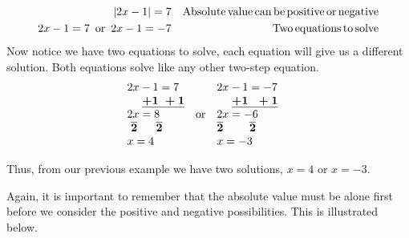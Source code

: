 \begin{example}\label{Lin38}
  \begin{eqnarray*}
    |2x - 1| = 7 &  & \operatorname{Absolute} \operatorname{value} \operatorname{can} \operatorname{be}
    \operatorname{positive} \operatorname{or} \operatorname{negative}\\
    2 x - 1 = 7 \operatorname{~or~} 2 x - 1 = - 7 &  & \operatorname{Two} \operatorname{equations}
    \operatorname{to} \operatorname{solve}
  \end{eqnarray*}
   Now notice we have two equations to solve, each equation will give us a
  different solution. Both equations solve like any other two-step equation.
  \begin{eqnarray*}
    \begin{array}{l}
      2 x - 1 = 7\\
      ~~~~\boldsymbol{\underline{+ 1 ~+ 1}}\\
      2 x = 8\\
      ~\boldsymbol{\overline{2} ~~~~~ \overline{2}}\\
      x = 4
    \end{array} \operatorname{~or~} \begin{array}{l}
      2 x - 1 = - 7\\
      ~~~~\underline{\boldsymbol{+ 1 ~~+ 1}}\\
      2 x = - 6\\
      \boldsymbol{\overline{2} ~~~~~~~ \overline{2}}\\
      x = - 3
    \end{array} &  & 
  \end{eqnarray*}
\end{example}  
  
 Thus, from our previous example we have two solutions, $x = 4$ or $x = - 3$.\pp

 Again, it is important to remember that the absolute value must be alone first
before we consider the positive and negative possibilities. This is
illustrated below.


